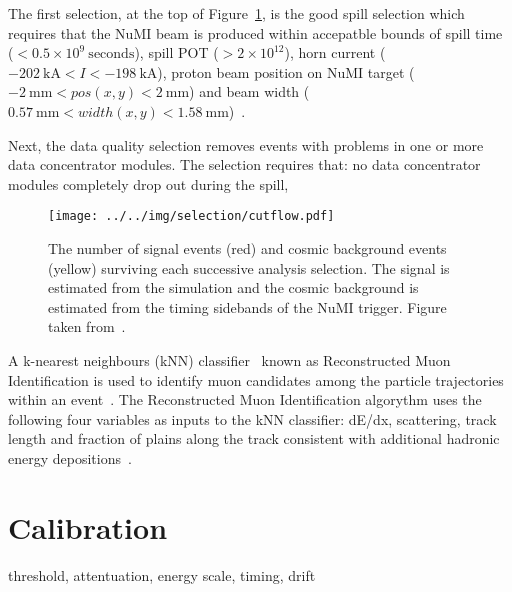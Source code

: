 The first selection, at the top of Figure~\ref{fig:cosCutFlow}, is the
good spill selection which requires that the
NuMI beam is produced within accepatble bounds of spill time ($< 0.5
\times 10^9~\text{seconds}$), 
spill POT ($> 2 \times 10^{12}$), 
horn current ($-202~\text{kA} < I < -198~\text{kA}$), proton beam
position on NuMI target ($-2~\text{mm} < pos(x,y) < 2~\text{mm}$) and
beam width ($0.57~\text{mm} < width(x,y) <
1.58~\text{mm}$)\cite{NOvASADAQ}~\cite{NOvAFABeamMon}.  

Next, the data quality selection removes events with problems in one
or more data concentrator modules. 
The selection requires that: no data concentrator modules completely
drop out during the spill, 








\begin{figure}
  \centering
  \texttt{[image: ../../img/selection/cutflow.pdf]}
  \caption{The number of signal events (red) and cosmic background
    events (yellow) surviving each successive analysis selection. The
    signal is estimated from the simulation and the cosmic background
    is estimated from the timing sidebands of the NuMI trigger. Figure
    taken from~\cite{NOvANumuSABless}.
  } 
  \label{fig:cosCutFlow}
\end{figure}

A k-nearest neighbours (kNN) classifier~\cite{altman1992introduction}
known as Reconstructed Muon Identification
is used to identify muon candidates among the particle
trajectories within an event~\cite{raddatzThesis}. 
The Reconstructed Muon Identification algorythm uses the following
four variables as inputs to the kNN classifier: 
dE/dx, scattering, track length and fraction of plains along the track
consistent with additional hadronic energy depositions~\cite{raddatzThesis}.



\section{Calibration}\label{sec:calibration}


threshold, attentuation, energy scale, timing, drift



